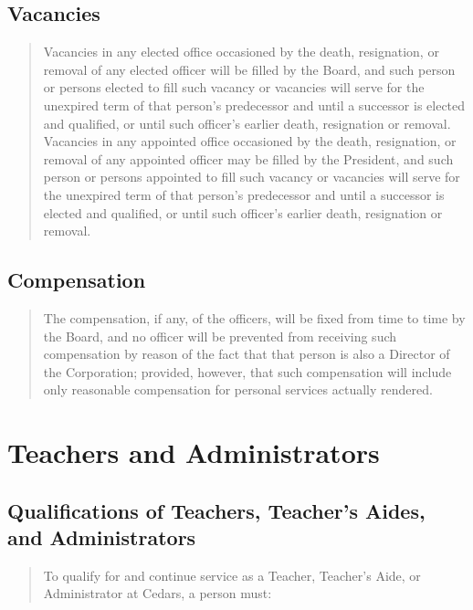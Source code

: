 \documentclass[
]{book}
\begin{document}
\section{Vacancies}\label{vacancies}

\begin{quote}
Vacancies in any elected office occasioned by the death, resignation,
or removal of any elected officer will be filled by the Board, and
such person or persons elected to fill such vacancy or vacancies will
serve for the unexpired term of that person's predecessor and until a
successor is elected and qualified, or until such officer's earlier
death, resignation or removal. Vacancies in any appointed office
occasioned by the death, resignation, or removal of any appointed
officer may be filled by the President, and such person or persons
appointed to fill such vacancy or vacancies will serve for the
unexpired term of that person's predecessor and until a successor is
elected and qualified, or until such officer's earlier death,
resignation or removal.
\end{quote}

\section{Compensation}\label{compensation}

\begin{quote}
The compensation, if any, of the officers, will be fixed from time to
time by the Board, and no officer will be prevented from receiving
such compensation by reason of the fact that that person is also a
Director of the Corporation; provided, however, that such compensation
will include only reasonable compensation for personal services
actually rendered.
\end{quote}

\chapter{Teachers and Administrators}\label{teachers-and-administrators}

\section{Qualifications of Teachers, Teacher's Aides, and Administrators}\label{qualifications-of-teachers-teachers-aides-and-administrators}

\begin{quote}
To qualify for and continue service as a Teacher, Teacher's Aide, or
Administrator at Cedars, a person must:
\end{quote}
\end{document}

